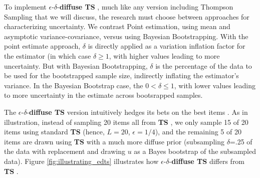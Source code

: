 \documentclass[a4paper,12pt]{article}
\newcommand{\ts}{\textbf{TS} }
\newcommand{\edts}{$\epsilon$-$\delta$-\textbf{diffuse TS} }
\newcommand{\numperset}{L}
\begin{document}
To implement \edts, much like any version including Thompson Sampling that we will discuss, the research must choose between approaches for characterizing uncertainty. We contrast Point estimation, using mean and asymptotic variance-covariance, versus using Bayesian Bootstrapping. With the point estimate approach, $\delta$ is directly applied as a variation inflation factor for the estimator (in which case $\delta \geq 1$, with higher values leading to more uncertainty. But with Bayesian Bootstrapping, $\delta$ is the percentage of the data to be used for the bootstrapped sample size, indirectly inflating the estimator's variance. In the Bayesian Bootstrap case, the $0 < \delta \leq 1$, with lower values leading to more uncertainty in the estimate across bootsrapped samples.

The \edts version intuitively hedges its bets on the best items .  As in illustration, instead of sampling 20 items all from \ts, we only sample 15 of 20 items using standard \ts (hence, $\numperset=20$, $\epsilon=1/4$), and the remaining 5 of 20 items are drawn using \ts with a much more diffuse prior (subsampling $\delta$=.25 of the data with replacement and drawing $u$ as a Bayes bootstrap of the subsampled data). Figure \ref{fig:illustrating_edts} illustrates how \edts differs from \ts. 
\end{document}
